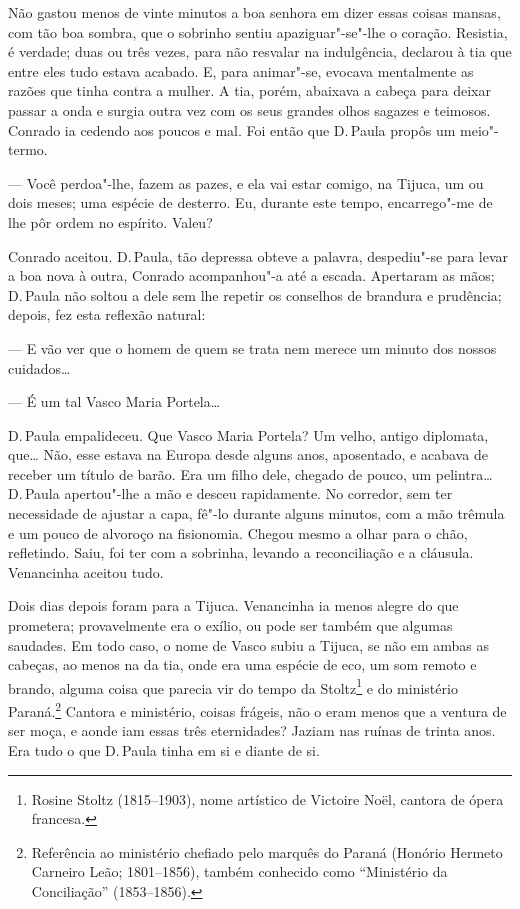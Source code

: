 \begin{linenumbers}
Não gastou menos de vinte minutos a boa senhora em dizer essas coisas
mansas, com tão boa sombra, que o sobrinho sentiu apaziguar"-se"-lhe o
coração. Resistia, é verdade; duas ou três vezes, para não resvalar na
indulgência, declarou à tia que entre eles tudo estava acabado. E, para
animar"-se, evocava mentalmente as razões que tinha contra a mulher. A
tia, porém, abaixava a cabeça para deixar passar a onda e surgia outra
vez com os seus grandes olhos sagazes e teimosos. Conrado ia cedendo aos
poucos e mal. Foi então que D.\,Paula propôs um meio"-termo.

--- Você perdoa"-lhe, fazem as pazes, e ela vai estar comigo, na Tijuca,
um ou dois meses; uma espécie de desterro. Eu, durante este tempo,
encarrego"-me de lhe pôr ordem no espírito. Valeu?

Conrado aceitou. D.\,Paula, tão depressa obteve a palavra, despediu"-se
para levar a boa nova à outra, Conrado acompanhou"-a até a escada.
Apertaram as mãos; D.\,Paula não soltou a dele sem lhe repetir os
conselhos de brandura e prudência; depois, fez esta reflexão natural:

--- E vão ver que o homem de quem se trata nem merece um minuto dos
nossos cuidados\ldots{}

--- É um tal Vasco Maria Portela\ldots{}

D.\,Paula empalideceu. Que Vasco Maria Portela? Um velho, antigo
diplomata, que\ldots{} Não, esse estava na Europa desde alguns anos,
aposentado, e acabava de receber um título de barão. Era um filho dele,
chegado de pouco, um pelintra\ldots{} D.\,Paula apertou"-lhe a mão e desceu
rapidamente. No corredor, sem ter necessidade de ajustar a capa, fê"-lo
durante alguns minutos, com a mão trêmula e um pouco de alvoroço na
fisionomia. Chegou mesmo a olhar para o chão, refletindo. Saiu, foi ter
com a sobrinha, levando a reconciliação e a cláusula. Venancinha aceitou
tudo.

Dois dias depois foram para a Tijuca. Venancinha ia menos alegre do que
prometera; provavelmente era o exílio, ou pode ser também que algumas
saudades. Em todo caso, o nome de Vasco subiu a Tijuca, se não em ambas
as cabeças, ao menos na da tia, onde era uma espécie de eco, um som
remoto e brando, alguma coisa que parecia vir do tempo da
Stoltz\footnote{Rosine Stoltz (1815--1903), nome artístico de Victoire
  Noël, cantora de ópera francesa.} e do ministério Paraná.\footnote{Referência
  ao ministério chefiado pelo marquês do Paraná (Honório Hermeto
  Carneiro Leão; 1801--1856), também conhecido como ``Ministério da
  Conciliação'' (1853--1856).} Cantora e ministério, coisas frágeis, não
o eram menos que a ventura de ser moça, e aonde iam essas três
eternidades? Jaziam nas ruínas de trinta anos. Era tudo o que D.\,Paula
tinha em si e diante de si.


\end{linenumbers}
